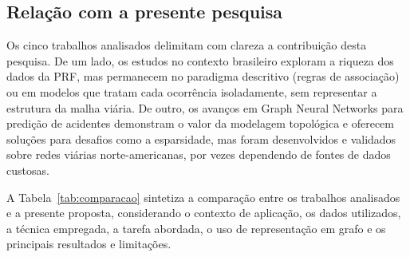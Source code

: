 \documentclass[12pt]{article}
\begin{document}
\subsection{Relação com a presente pesquisa}

Os cinco trabalhos analisados delimitam com clareza a contribuição desta
pesquisa. De um lado, os estudos no contexto brasileiro
\cite{araujo2022,amorim2023} exploram a riqueza dos dados da PRF, mas
permanecem no paradigma descritivo (regras de associação) ou em modelos
que tratam cada ocorrência isoladamente, sem representar a estrutura da
malha viária. De outro, os avanços em Graph Neural Networks para
predição de acidentes \cite{zhang2026,nippani2023,zhuang2024} demonstram
o valor da modelagem topológica e oferecem soluções para desafios como a
esparsidade, mas foram desenvolvidos e validados sobre redes viárias
norte-americanas, por vezes dependendo de fontes de dados custosas.

A Tabela~\ref{tab:comparacao} sintetiza a comparação entre os trabalhos
analisados e a presente proposta, considerando o contexto de aplicação,
os dados utilizados, a técnica empregada, a tarefa abordada, o uso de
representação em grafo e os principais resultados e limitações.
\end{document}
